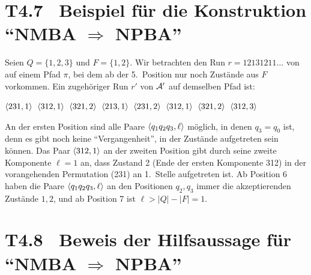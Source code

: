 \documentclass[fontsize=11pt, twoside=false, numbers=autoenddot]{scrbook}
\begin{document}
\section*{{\boldmath T4.7~ Beispiel für die Konstruktion "`NMBA $\Rightarrow$ NPBA"'}}

Seien $Q=\{1,2,3\}$ und $F=\{1,2\}$.
Wir betrachten den Run $r=12131211\dots$ von \Amc auf einem Pfad $\pi$,
bei dem ab der 5.\ Position nur noch Zustände aus $F$ vorkommen.
Ein zugehöriger Run $r'$ von $\mathcal{A}'$ auf demselben Pfad ist:
%
\begin{center}
  $\langle 231,1\rangle$\,
  $\langle 312,1\rangle$\,
  $\langle 321,2\rangle$\,
  $\langle 213,1\rangle$\,
  $\langle 231,2\rangle$\,
  $\langle 312,1\rangle$\,
  $\langle 321,2\rangle$\,
  $\langle 312,3\rangle$
\end{center}
An der ersten Position sind alle Paare $\langle q_1q_2q_3,\ell\rangle$ möglich,
in denen $q_3 = q_0$ ist, denn es gibt noch keine "`Vergangenheit"',
in der Zustände aufgetreten sein können.
Das Paar $\langle 312,1\rangle$ an der zweiten Position gibt durch seine zweite
Komponente $\ell=1$ an, dass Zustand 2 (Ende der ersten Komponente 312)
in der vorangehenden Permutation (231) an 1.\ Stelle aufgetreten ist.
Ab Position 6 haben die Paare $\langle q_1q_2q_3,\ell\rangle$
an den Positionen $q_2,q_3$ immer die akzeptierenden Zustände $1,2$,
und ab Position 7 ist $\ell > |Q|-|F| = 1$.

\goodbreak
\section*{{\boldmath T4.8~ Beweis der Hilfsaussage für "`NMBA $\Rightarrow$ NPBA"'}}
\end{document}
